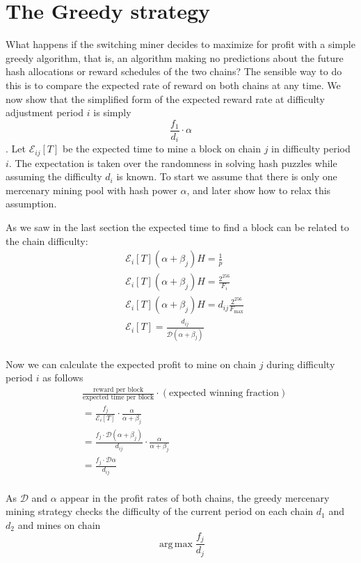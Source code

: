 \documentclass[10pt, preprint]{aastex}
\DeclareMathOperator*{\argmax}{arg\,max}
\begin{document}
\section{The Greedy strategy}
What happens if the switching miner decides to maximize for profit with a simple greedy algorithm, that is, an algorithm making no predictions about the future hash allocations or reward schedules of the two chains?  The sensible way to do this is to compare the expected rate of reward on both chains at any time.  We now show that the simplified form of the expected reward rate at difficulty adjustment period $i$ is simply $$\frac{f_1}{d_i} \cdot \alpha$$.  Let $\mathcal{E}_{ij}[T]$ be the expected time to mine a block on chain $j$ in difficulty period $i$.  The expectation is taken over the randomness in solving hash puzzles while assuming the difficulty $d_i$ is known.  To start we assume that there is only one mercenary mining pool with hash power $\alpha$, and later show how to relax this assumption.

As we saw in the last section the expected time to find a block can be related to the chain difficulty:
\begin{align*}
& \mathcal{E}_i[T] (\alpha + \beta_j)H = \frac{1}{p} \\
& \mathcal{E}_i[T] (\alpha + \beta_j)H = \frac{2^{256}}{F_{i}}\\
& \mathcal{E}_i[T] (\alpha + \beta_j)H = d_{ij} \frac{2^{256}}{F_{\text{max}}}\\
& \mathcal{E}_i[T] = \frac{d_{ij}}{\mathcal{D}(\alpha + \beta_j)} \\
\end{align*}

Now we can calculate the expected profit to mine on chain $j$ during difficulty period $i$ as follows
\begin{align*}
& \frac{\text{reward per block} }{\text{expected time per block}} \cdot (\text{expected winning fraction}) \\
&= \frac{f_j}{\mathcal{E}_i[T]} \cdot \frac{\alpha}{\alpha + \beta_j}\\
&= \frac{f_j \cdot \mathcal{D}(\alpha + \beta_j)}{d_{ij}} \cdot \frac{\alpha}{\alpha + \beta_j}\\
&= \frac{f_j \cdot \mathcal{D}\alpha}{d_{ij}}\\
\end{align*}

As $\mathcal{D}$ and $\alpha$ appear in the profit rates of both chains, the greedy mercenary mining strategy checks the difficulty of the current period on each chain $d_1$ and $d_2$ and mines on chain
$$\argmax{\frac{f_j}{d_j}}$$
\end{document}

